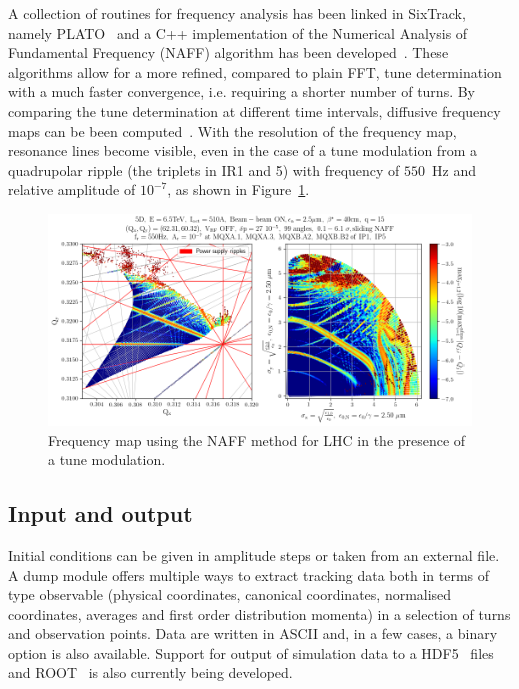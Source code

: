 \documentclass[a4paper,
              ]{jacow}
\begin{document}
A collection of routines for frequency analysis has been linked in SixTrack, namely PLATO~\cite{plato} and a C++ implementation of the Numerical Analysis of Fundamental Frequency (NAFF) algorithm has been developed~\cite{naff}. These algorithms allow for a more refined, compared to plain FFT, tune determination with a much faster convergence, i.e. requiring a shorter number of turns. By comparing the tune determination at different time intervals,  diffusive frequency maps can be been computed~\cite{laskar}. With the resolution of the frequency map, resonance lines become visible, even in the case of a tune modulation from a quadrupolar ripple (the triplets in IR1 and 5) with frequency of $550$~Hz and relative amplitude of $10^{-7}$, as shown in Figure~\ref{fig:fma}.

\begin{figure}[!tbh]
\centering
 \includegraphics[width=\textwidth]{FMA.png}
 \caption{Frequency map using the NAFF method for LHC in the presence of a tune modulation.}
 \label{fig:fma}
\end{figure}

\subsection{Input and output}

Initial conditions can be given in amplitude steps or taken from an external file. A dump module offers multiple ways to extract tracking data both in terms of type observable (physical coordinates, canonical coordinates, normalised coordinates, averages and first order distribution momenta) in a selection of turns and observation points. Data are written in ASCII and, in a few cases, a binary option is also available. Support for output of simulation data to a HDF5~\cite{hdf5} files and ROOT~\cite{root} is also currently being developed.
\end{document}

